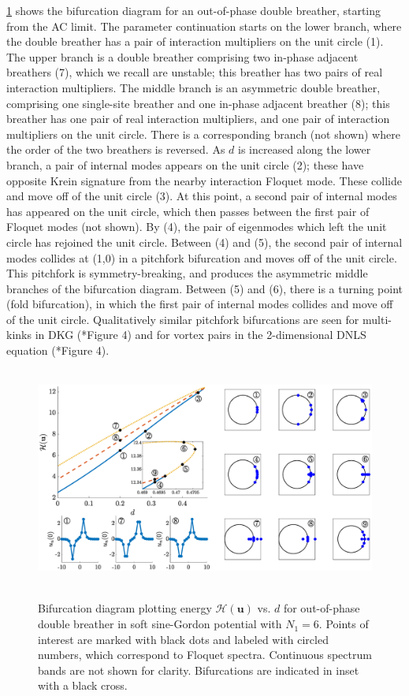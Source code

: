 \documentclass[12pt,reqno]{amsart}
\newcommand{\uvec}{\mathbf{u}}
\theoremstyle{definition}
\begin{document}
\cref{fig:bifdiagSGoop1} shows the bifurcation diagram for an out-of-phase double breather, starting from the AC limit. The parameter continuation starts on the lower branch, where the double breather has a pair of interaction multipliers on the unit circle (1). The upper branch is a double breather comprising two in-phase adjacent breathers (7), which we recall are unstable; this breather has two pairs of real interaction multipliers. The middle branch is an asymmetric double breather, comprising one single-site breather and one in-phase adjacent breather (8); this breather has one pair of real interaction multipliers, and one pair of interaction multipliers on the unit circle. There is a corresponding branch (not shown) where the order of the two breathers is reversed. As $d$ is increased along the lower branch, a pair of internal modes appears on the unit circle (2); these have opposite Krein signature from the nearby interaction Floquet mode. These collide and move off of the unit circle (3). At this point, a second pair of internal modes has appeared on the unit circle, which then passes between the first pair of Floquet modes (not shown). By (4), the pair of eigenmodes which left the unit circle has rejoined the unit circle. Between (4) and (5), the second pair of internal modes collides at (1,0) in a pitchfork bifurcation and moves off of the unit circle. This pitchfork is symmetry-breaking, and produces the asymmetric middle branches of the bifurcation diagram. Between (5) and (6), there is a turning point (fold bifurcation), in which the first pair of internal modes collides and move off of the unit circle. Qualitatively similar pitchfork bifurcations are seen for multi-kinks in DKG (\cite{Parker2021}*{Figure 4}) and for vortex pairs in the 2-dimensional DNLS equation (\cite{Bramburger2020}*{Figure 4}).

\begin{figure}
	\hbox{
	\hspace{-2cm}
	\includegraphics[width=20cm]{bifdiagSGoppositeN6.eps} 
	}
	\caption{Bifurcation diagram plotting energy $\mathcal{H}(\uvec)$ vs. $d$ for out-of-phase double breather in soft sine-Gordon potential with $N_1 = 6$. Points of interest are marked with black dots and labeled with circled numbers, which correspond to Floquet spectra. Continuous spectrum bands are not shown for clarity. Bifurcations are indicated in inset with a black cross.}
	\label{fig:bifdiagSGoop1}
\end{figure}
\end{document}
